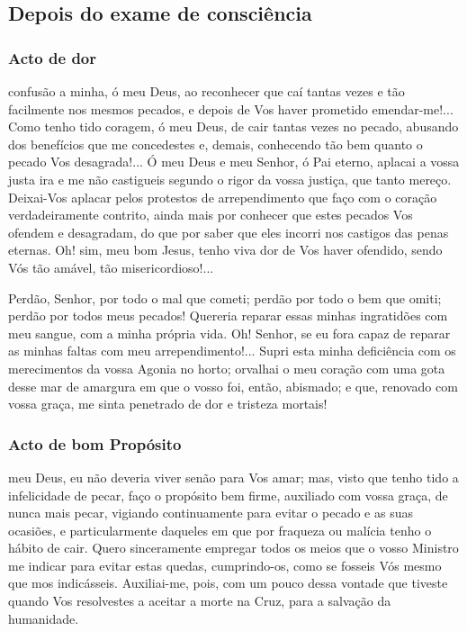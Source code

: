 \subsection{Depois do exame de consciência}

\subsubsection{Acto de dor}

 confusão a minha, ó meu Deus, ao reconhecer que caí tantas vezes e tão facilmente nos mesmos pecados, e depois de Vos haver prometido emendar-me!... Como tenho tido coragem, ó meu Deus, de cair tantas vezes no pecado, abusando dos benefícios que me concedestes e, demais, conhecendo tão bem quanto o pecado Vos desagrada!... Ó meu Deus e meu Senhor, ó Pai eterno, aplacai a vossa justa ira e me não castigueis segundo o rigor da vossa justiça, que tanto mereço. Deixai-Vos aplacar pelos protestos de arrependimento que faço com o coração verdadeiramente contrito, ainda mais por conhecer que estes pecados Vos ofendem e desagradam, do que por saber que eles incorri nos castigos das penas eternas. Oh! sim, meu bom Jesus, tenho viva dor de Vos haver ofendido, sendo Vós tão amável, tão misericordioso!...\par
Perdão, Senhor, por todo o mal que cometi; perdão por todo o bem que omiti; perdão por todos meus pecados! Quereria reparar essas minhas ingratidões com meu sangue, com a minha própria vida. Oh! Senhor, se eu fora capaz de reparar as minhas faltas com meu arrependimento!... Supri esta minha deficiência com os merecimentos da vossa Agonia no horto; orvalhai o meu coração com uma gota desse mar de amargura em que o vosso foi, então, abismado; e que, renovado com vossa graça, me sinta penetrado de dor e tristeza mortais!

\subsubsection{Acto de bom Propósito}

 meu Deus, eu não deveria viver senão para Vos amar; mas, visto que tenho tido a infelicidade de pecar, faço o propósito bem firme, auxiliado com vossa graça, de nunca mais pecar, vigiando continuamente para evitar o pecado e as suas ocasiões, e particularmente daqueles em que por fraqueza ou malícia tenho o hábito de cair. Quero sinceramente empregar todos os meios que o vosso Ministro me indicar para evitar estas quedas, cumprindo-os, como se fosseis Vós mesmo que mos indicásseis. Auxiliai-me, pois, com um pouco dessa vontade que tiveste quando Vos resolvestes a aceitar a morte na Cruz, para a salvação da humanidade.

